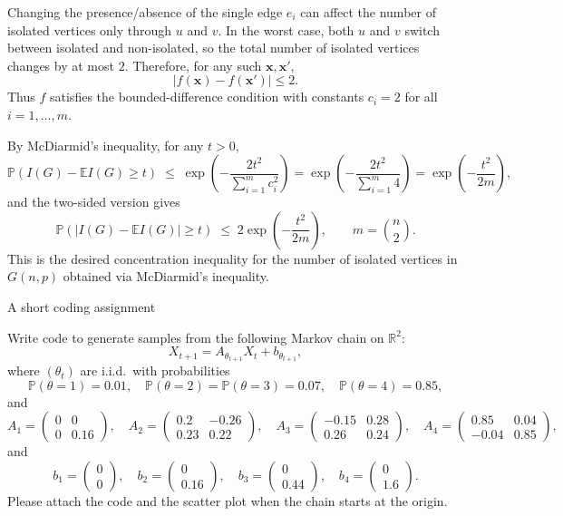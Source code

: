 \documentclass[answers,12pt,addpoints]{exam}
\begin{document}
\begin{questions}
\begin{solution}
Changing the presence/absence of the single edge $e_i$ can affect the number of
isolated vertices only through $u$ and $v$. In the worst case, both $u$ and $v$
switch between isolated and non-isolated, so the total number of isolated vertices
changes by at most $2$. Therefore, for any such $\mathbf{x},\mathbf{x}'$,
\[
\big| f(\mathbf{x}) - f(\mathbf{x}') \big| \le 2.
\]
Thus $f$ satisfies the bounded-difference condition with constants $c_i = 2$ for
all $i = 1,\dots,m$.

\medskip

By McDiarmid's inequality, for any $t>0$,
\[
\mathbb{P}\!\left( I(G) - \mathbb{E}I(G) \ge t \right)
\;\le\;
\exp\!\left( -\frac{2 t^2}{\sum_{i=1}^m c_i^2} \right)
=\exp\!\left( -\frac{2 t^2}{\sum_{i=1}^m 4} \right)
=
\exp\!\left( -\frac{t^2}{2m} \right),
\]
and the two-sided version gives
\[
\mathbb{P}\!\left( \big|I(G) - \mathbb{E}I(G)\big| \ge t \right)
\;\le\;
2\exp\!\left( -\frac{t^2}{2m} \right),
\qquad m = \binom{n}{2}.
\]
This is the desired concentration inequality for the number of isolated vertices
in $G(n,p)$ obtained via McDiarmid's inequality.
\end{solution}

\newpage

\question A short coding assignment

Write code to generate samples from the following Markov chain on \(\mathbb{R}^2\):
\[
X_{t+1} = A_{\theta_{t+1}} X_t + b_{\theta_{t+1}},
\]
where \((\theta_t)\) are i.i.d.\ with probabilities
\[
\mathbb{P}(\theta = 1) = 0.01,\quad
\mathbb{P}(\theta = 2) = \mathbb{P}(\theta = 3) = 0.07,\quad
\mathbb{P}(\theta = 4) = 0.85,
\]
and
\[
A_1 = \begin{pmatrix}0 & 0\\ 0 & 0.16\end{pmatrix},\quad
A_2 = \begin{pmatrix}0.2 & -0.26\\ 0.23 & 0.22\end{pmatrix},\quad
A_3 = \begin{pmatrix}-0.15 & 0.28\\ 0.26 & 0.24\end{pmatrix},\quad
A_4 = \begin{pmatrix}0.85 & 0.04\\ -0.04 & 0.85\end{pmatrix},
\]
and
\[
b_1 = \begin{pmatrix}0\\ 0\end{pmatrix},\quad
b_2 = \begin{pmatrix}0\\ 0.16\end{pmatrix},\quad
b_3 = \begin{pmatrix}0\\ 0.44\end{pmatrix},\quad
b_4 = \begin{pmatrix}0\\ 1.6\end{pmatrix}.
\]
Please attach the code and the scatter plot when the chain starts at the origin. 


\end{questions}
\end{document}
